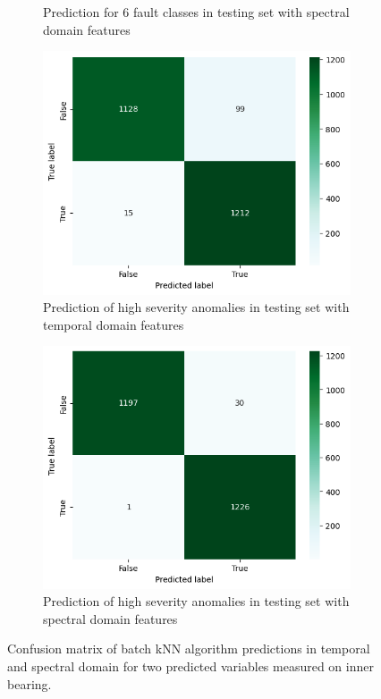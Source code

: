 \begin{figure}[ht]
\begin{subfigure}[b]{0.49\textwidth}
        \caption{Prediction for 6 fault classes in testing set with spectral domain features}
    \end{subfigure}
    \begin{subfigure}[b]{0.49\textwidth}
        \includegraphics[width=\textwidth]{assets/design/kNN-temporal-confusion-matrix-anomaly90.png}
        \caption{Prediction of high severity anomalies in testing set with temporal domain features}
    \end{subfigure}
    \hfill
    \begin{subfigure}[b]{0.49\textwidth}
        \includegraphics[width=\textwidth]{assets/design/kNN-spectral-confusion-matrix-anomaly90.png}
        \caption{Prediction of high severity anomalies in testing set with spectral domain features}
    \end{subfigure}
    \caption{Confusion matrix of batch kNN algorithm predictions in temporal and spectral domain for two predicted variables measured on inner bearing.}
\end{figure}


